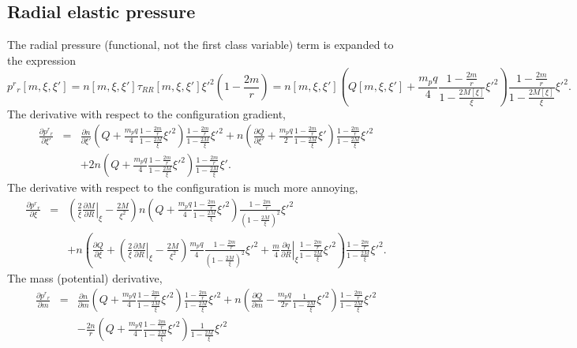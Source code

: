 \subsection{Radial elastic pressure}
The radial pressure (functional, not the first class variable) term is expanded to the expression
\begin{equation}
p^r{}_r[m,\xi,\xi'] = n[m,\xi,\xi']\tau_{RR}[m,\xi,\xi']\xi'^2\left(1 - \frac{2m}{r}\right)
  = n[m,\xi,\xi']\left(Q[m,\xi,\xi'] + \frac{m_pq}{4}\frac{1-\frac{2m}{r}}{1-\frac{2M[\xi]}{\xi}}\xi'^2\right)\frac{1-\frac{2m}{r}}{1-\frac{2M[\xi]}{\xi}}\xi'^2.
\label{eq:radialPressureExpanded}
\end{equation}
The derivative with respect to the configuration gradient,
\begin{eqnarray}
  \nonumber \frac{\partial p^r{}_r}{\partial \xi'} & = & \frac{\partial n}{\partial\xi'}\left(Q + \frac{m_pq}{4}\frac{1-\frac{2m}{r}}{1-\frac{2M}{\xi}}\xi'^2\right)\frac{1-\frac{2m}{r}}{1-\frac{2M}{\xi}}\xi'^2 + n\left(\frac{\partial Q}{\partial \xi'} + \frac{m_pq}{2}\frac{1-\frac{2m}{r}}{1-\frac{2M}{\xi}}\xi'\right)\frac{1-\frac{2m}{r}}{1-\frac{2M}{\xi}}\xi'^2\\
 \label{eq:dradialPressure:dxi} & & + 2n\left(Q +  \frac{m_pq}{4}\frac{1-\frac{2m}{r}}{1-\frac{2M}{\xi}}\xi'^2\right)\frac{1-\frac{2m}{r}}{1-\frac{2M}{\xi}}\xi'.	
\end{eqnarray}
The derivative with respect to the configuration is much more annoying,
\begin{eqnarray}
  \nonumber \frac{\partial p^r{}_r}{\partial \xi} & = & \left(\frac{2}{\xi}\left.\frac{\partial M}{\partial R}\right|_{\xi} - \frac{2M}{\xi^2}\right)n\left(Q + \frac{m_pq}{4}\frac{1-\frac{2m}{r}}{1-\frac{2M}{\xi}}\xi'^2\right)\frac{1-\frac{2m}{r}}{\left(1-\frac{2M}{\xi}\right)^2}\xi'^2\\
  \label{eq:dradialPressure:xi}& &+ n\left(\frac{\partial Q}{\partial \xi} + \left(\frac{2}{\xi}\left.\frac{\partial M}{\partial R}\right|_{\xi} - \frac{2M}{\xi^2}\right) \frac{m_pq}{4}\frac{1-\frac{2m}{r}}{\left(1-\frac{2M}{\xi}\right)^2}\xi'^2 + \frac{m}{4}\left.\frac{\partial q}{\partial R}\right|_\xi\frac{1-\frac{2m}{r}}{1-\frac{2M}{\xi}}\xi'^2\right)\frac{1-\frac{2m}{r}}{1-\frac{2M}{\xi}}\xi'^2.
\end{eqnarray}
The mass (potential) derivative,
\begin{eqnarray}
\nonumber \frac{\partial p^r{}_r}{\partial m} & = & \frac{\partial n}{\partial m}\left(Q + \frac{m_pq}{4}\frac{1-\frac{2m}{r}}{1-\frac{2M}{\xi}}\xi'^2\right)\frac{1-\frac{2m}{r}}{1-\frac{2M}{\xi}}\xi'^2 + n\left(\frac{\partial Q}{\partial m} - \frac{m_pq}{2r}\frac{1}{1-\frac{2M}{\xi}}\xi'^2\right)\frac{1-\frac{2m}{r}}{1-\frac{2M}{\xi}}\xi'^2\\
&&-\frac{2n}{r}\left(Q + \frac{m_pq}{4}\frac{1-\frac{2m}{r}}{1-\frac{2M}{\xi}}\xi'^2\right)\frac{1}{1-\frac{2M}{\xi}}\xi'^2
\label{eq:dradialPressure:m}
\end{eqnarray}

